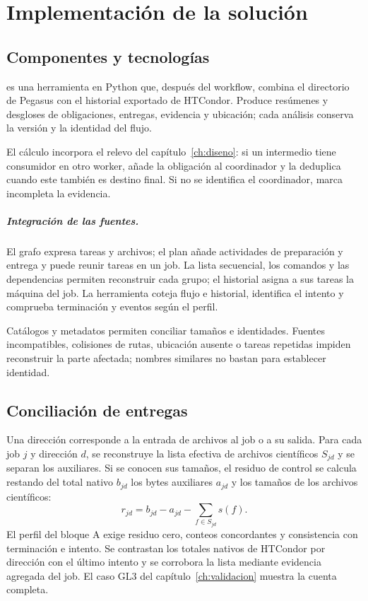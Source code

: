 \chapter{Implementación de la solución}
\label{ch:implementacion}
\section{Componentes y tecnologías}
\Analyzer{} es una herramienta en Python que, después del workflow, combina el directorio de Pegasus con el historial exportado de HTCondor. Produce resúmenes y desgloses de obligaciones, entregas, evidencia y ubicación; cada análisis conserva la versión y la identidad del flujo.

El cálculo incorpora el relevo del capítulo~\ref{ch:diseno}: si un intermedio tiene consumidor en otro worker, añade la obligación al coordinador y la deduplica cuando este también es destino final. Si no se identifica el coordinador, marca incompleta la evidencia.

\paragraph{Integración de las fuentes.}
El grafo expresa tareas y archivos; el plan añade actividades de preparación y entrega y puede reunir tareas en un job. La lista secuencial, los comandos y las dependencias permiten reconstruir cada grupo; el historial asigna a sus tareas la máquina del job. La herramienta coteja flujo e historial, identifica el intento y comprueba terminación y eventos según el perfil.

Catálogos y metadatos permiten conciliar tamaños e identidades. Fuentes incompatibles, colisiones de rutas, ubicación ausente o tareas repetidas impiden reconstruir la parte afectada; nombres similares no bastan para establecer identidad.

\section{Conciliación de entregas}
Una dirección corresponde a la entrada de archivos al job o a su salida. Para cada job $j$ y dirección $d$, se reconstruye la lista efectiva de archivos científicos $S_{jd}$ y se separan los auxiliares. Si se conocen sus tamaños, el residuo de control se calcula restando del total nativo $b_{jd}$ los bytes auxiliares $a_{jd}$ y los tamaños de los archivos científicos:
\begin{equation}
r_{jd}=b_{jd}-a_{jd}-\sum_{f\in S_{jd}}s(f).
\label{eq:residuo}
\end{equation}
El perfil del bloque A exige residuo cero, conteos concordantes y consistencia con terminación e intento. Se contrastan los totales nativos de HTCondor por dirección con el último intento y se corrobora la lista mediante evidencia agregada del job. El caso GL3 del capítulo~\ref{ch:validacion} muestra la cuenta completa.

